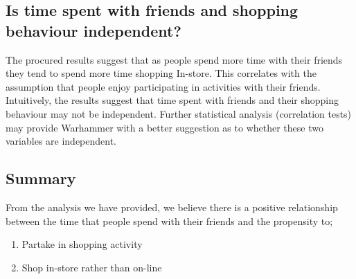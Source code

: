 \documentclass[11pt]{article}
\begin{document}
\begin{center}
\end{center}

\subsection{Is time spent with friends and shopping behaviour independent?}

The procured results suggest that as people spend more time with their friends they tend to spend more time shopping In-store. This correlates with the assumption that people enjoy participating in activities with their friends. Intuitively, the results suggest that time spent with friends and their shopping behaviour may not be independent. Further statistical analysis (correlation tests) may provide Warhammer with a better suggestion as to whether these two variables are independent.
\newpage
\subsection{Summary}

From the analysis we have provided, we believe there is a positive relationship between the time that people spend with their friends and the propensity to;

\begin{enumerate}
\item Partake in shopping activity
\item Shop in-store rather than on-line
\end{enumerate}
\end{document}
